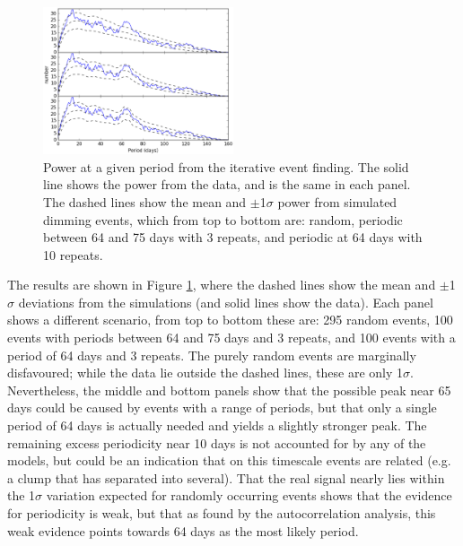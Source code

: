 \documentclass[]{rsos}
\begin{document}
\begin{figure}
  \begin{center}
    \hspace{-0.5cm} \includegraphics[width=0.5\textwidth]{figs/hist_single.ps}
    \caption{Power at a given period from the iterative event finding. The solid line
      shows the power from the data, and is the same in each panel. The dashed lines show
      the mean and $\pm$1$\sigma$ power from simulated dimming events, which from top to
      bottom are: random, periodic between 64 and 75 days with 3 repeats, and periodic at
      64 days with 10 repeats.}\label{fig:hist}
  \end{center}
\end{figure}

The results are shown in Figure \ref{fig:hist}, where the dashed lines show the mean and
$\pm$1$\sigma$ deviations from the simulations (and solid lines show the data). Each
panel shows a different scenario, from top to bottom these are: 295 random events, 100
events with periods between 64 and 75 days and 3 repeats, and 100 events with a period of
64 days and 3 repeats. The purely random events are marginally disfavoured; while the
data lie outside the dashed lines, these are only 1$\sigma$. Nevertheless, the middle and
bottom panels show that the possible peak near 65 days could be caused by events with a
range of periods, but that only a single period of 64 days is actually needed and yields
a slightly stronger peak. The remaining excess periodicity near 10 days is not accounted
for by any of the models, but could be an indication that on this timescale events are
related (e.g. a clump that has separated into several). That the real signal nearly lies
within the 1$\sigma$ variation expected for randomly occurring events shows that the
evidence for periodicity is weak, but that as found by the autocorrelation analysis, this
weak evidence points towards 64 days as the most likely period.
\end{document}
